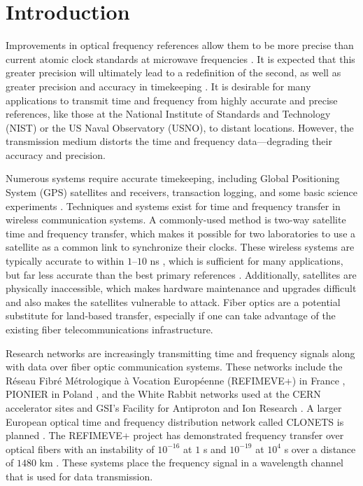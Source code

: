 \chapter{Introduction}

Improvements in optical frequency references allow them to be more precise than current atomic clock standards at microwave frequencies \cite{ProgressOpticalClock, RedefinitionOfSecond, Diddams2004}. It is expected that this greater precision will ultimately lead to a redefinition of the second, as well as greater precision and accuracy in timekeeping \cite{RedefinitionOfSecond}. It is desirable for many applications to transmit time and frequency from highly accurate and precise references, like those at the National Institute of Standards and Technology (NIST) or the US Naval Observatory (USNO), to distant locations. However, the transmission medium distorts the time and frequency data---degrading their accuracy and precision.


Numerous systems require accurate timekeeping, including Global Positioning System (GPS) satellites and receivers, transaction logging, and some basic science experiments \cite{ScienceOfTimekeeping}. Techniques and systems exist for time and frequency transfer in wireless communication systems.  A commonly-used method is two-way satellite time and frequency transfer, which makes it possible for two laboratories to use a satellite as a common link to synchronize their clocks. These wireless systems are typically accurate to within $1$--$10$ ns \cite{Allan1980}, which is sufficient for many applications, but far less accurate than the best primary references \cite{NISTFreqStandards, Audoin1976}. Additionally, satellites are physically inaccessible, which makes hardware maintenance and upgrades difficult and also makes the satellites vulnerable to attack. Fiber optics are a potential substitute for land-based transfer, especially if one can take advantage of the existing fiber telecommunications infrastructure.


Research networks are increasingly transmitting time and frequency signals along with data over fiber optic communication systems. These networks include the R\'eseau Fibr\'e M\'etrologique \`a Vocation Europ\'eenne (REFIMEVE+) in France \cite{cantin2017progress}, PIONIER in Poland \cite{Turza2017}, 
and the White Rabbit networks used at the CERN accelerator sites and GSI's Facility for Antiproton and Ion Research \cite{Serrano2013}.  
A larger European optical time and frequency distribution network called CLONETS is planned \cite{CLONETS}.
The REFIMEVE+ project has demonstrated frequency transfer over optical fibers with an instability of $10^{-16}$ at $1$ s and $10^{-19}$ at $10^4$ s over a distance of $1480$ km \cite{cantin2017progress}. These systems place the frequency signal in a wavelength channel that is used for data transmission.


